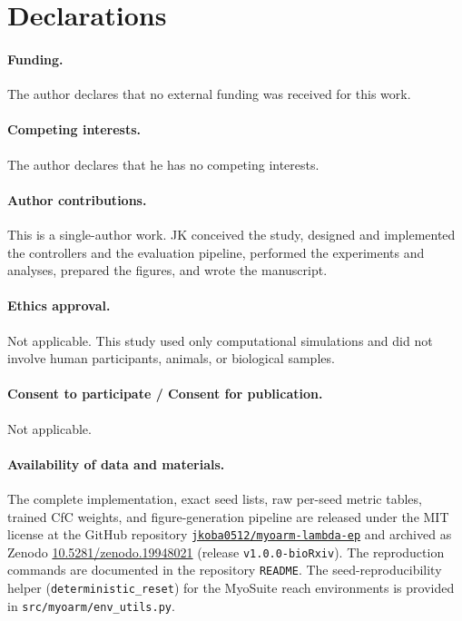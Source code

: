 \documentclass[sn-basic]{sn-jnl}
\begin{document}
\section*{Declarations}

\paragraph{Funding.} The author declares that no external funding was received for this work.

\paragraph{Competing interests.} The author declares that he has no competing interests.

\paragraph{Author contributions.} This is a single-author work. JK conceived the study, designed and implemented the controllers and the evaluation pipeline, performed the experiments and analyses, prepared the figures, and wrote the manuscript.

\paragraph{Ethics approval.} Not applicable. This study used only computational simulations and did not involve human participants, animals, or biological samples.

\paragraph{Consent to participate / Consent for publication.} Not applicable.

\paragraph{Availability of data and materials.} The complete implementation, exact seed lists, raw per-seed metric tables, trained CfC weights, and figure-generation pipeline are released under the MIT license at the GitHub repository \href{https://github.com/jkoba0512/myoarm-lambda-ep}{\texttt{jkoba0512/myoarm-lambda-ep}} and archived as Zenodo \href{https://doi.org/10.5281/zenodo.19948021}{10.5281/zenodo.19948021} (release \texttt{v1.0.0-bioRxiv}). The reproduction commands are documented in the repository \texttt{README}. The seed-reproducibility helper (\texttt{deterministic\_reset}) for the MyoSuite reach environments is provided in \texttt{src/myoarm/env\_utils.py}.
\end{document}
